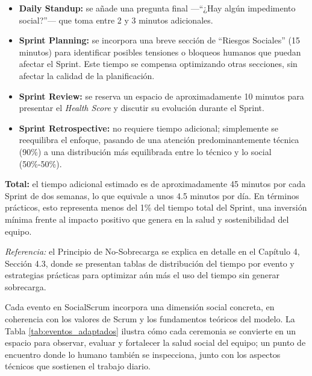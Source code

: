 \begin{itemize}
    \item \textbf{Daily Standup:} se añade una pregunta final —``¿Hay algún impedimento social?''— que toma entre 2 y 3 minutos adicionales.
    \item \textbf{Sprint Planning:} se incorpora una breve sección de ``Riesgos Sociales'' (15 minutos) para identificar posibles tensiones o bloqueos humanos que puedan afectar el Sprint. Este tiempo se compensa optimizando otras secciones, sin afectar la calidad de la planificación.
    \item \textbf{Sprint Review:} se reserva un espacio de aproximadamente 10 minutos para presentar el \textit{Health Score} y discutir su evolución durante el Sprint.
    \item \textbf{Sprint Retrospective:} no requiere tiempo adicional; simplemente se reequilibra el enfoque, pasando de una atención predominantemente técnica (90\%) a una distribución más equilibrada entre lo técnico y lo social (50\%-50\%).
\end{itemize}

\textbf{Total:} el tiempo adicional estimado es de aproximadamente 45 minutos por cada Sprint de dos semanas, lo que equivale a unos 4.5 minutos por día.
En términos prácticos, esto representa menos del 1\% del tiempo total del Sprint, una inversión mínima frente al impacto positivo que genera en la salud y sostenibilidad del equipo.

\emph{Referencia:} el Principio de No-Sobrecarga se explica en detalle en el Capítulo 4, Sección 4.3, donde se presentan tablas de distribución del tiempo por evento y estrategias prácticas para optimizar aún más el uso del tiempo sin generar sobrecarga.

Cada evento en SocialScrum incorpora una dimensión social concreta, en coherencia con los valores de Scrum y los fundamentos teóricos del modelo.
La Tabla \ref{tab:eventos_adaptados} ilustra cómo cada ceremonia se convierte en un espacio para observar, evaluar y fortalecer la salud social del equipo; un punto de encuentro donde lo humano también se inspecciona, junto con los aspectos técnicos que sostienen el trabajo diario.

